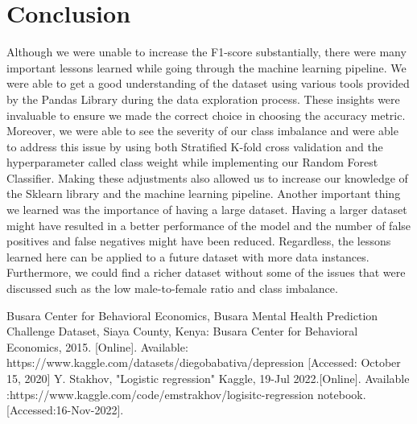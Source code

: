 \documentclass[conference]{IEEEtran}
\begin{document}
\section{Conclusion}
Although we were unable to increase the F1-score substantially, there were many important lessons learned while going through the machine learning pipeline. We were able to get a good understanding of the dataset using various tools provided by the Pandas Library during the data exploration process. These insights were invaluable to ensure we made the correct choice in choosing the accuracy metric. Moreover, we were able to see the severity of our class imbalance and were able to address this issue by using both Stratified K-fold cross validation and the hyperparameter called class weight while implementing our Random Forest Classifier. Making these adjustments also allowed us to increase our knowledge of the Sklearn library and the machine learning pipeline. Another important thing we learned was the importance of having a large dataset. Having a larger dataset might have resulted in a better performance of the model and the number of false positives and false negatives might have been reduced. Regardless, the lessons learned here can be applied to a future dataset with more data instances. Furthermore, we could find a richer dataset without some of the issues that were discussed such as the low male-to-female ratio and class imbalance.



\begin{thebibliography}{00}
 Busara Center for Behavioral Economics, Busara Mental Health Prediction Challenge Dataset, Siaya County, Kenya: Busara Center for Behavioral Economics, 2015. [Online]. Available: https://www.kaggle.com/datasets/diegobabativa/depression [Accessed: October 15, 2020]
 Y. Stakhov, "Logistic regression" Kaggle, 19-Jul 2022.[Online]. Available :https://www.kaggle.com/code/emstrakhov/logisitc-regression notebook. [Accessed:16-Nov-2022].


\end{thebibliography}
\vspace{12pt}
\color{red}
\end{document}
